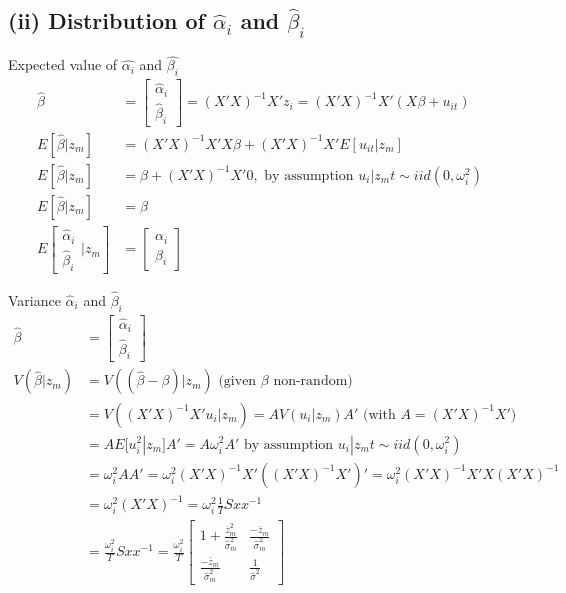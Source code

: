 \documentclass[]{article}
\begin{document}
\subsection{(ii) Distribution of  $\hat{\alpha}_i$ and $\hat{\beta}_i$}

Expected value of $\hat{\alpha_i}$ and $\hat{\beta_i}$
\begin{align*}
	\hat{\beta} &= \left[\begin{array}{c}
		\hat{\alpha}_i \\
		\hat{\beta}_i
	\end{array}\right] = (X'X)^{-1}X'z_i = (X'X)^{-1}X'(X \beta + u_{it})\\
	E[\hat{\beta}|z_m] &= (X'X)^{-1}X'X \beta + (X'X)^{-1}X'E[u_{it}|z_m]\\
	E[\hat{\beta}|z_m] &= \beta + (X'X)^{-1}X'0, \text{ by assumption } u_i|z_mt \sim iid(0, \omega_i^2)\\
	E[\hat{\beta}|z_m] &= \beta\\
	E\left[\begin{array}{c}
		\hat{\alpha}_i \\
		\hat{\beta}_i
	\end{array}|z_m\right] &= \left[\begin{array}{c}
		\alpha_i \\
		\beta_i
	\end{array}\right]
\end{align*}

Variance $\hat{\alpha}_i$ and $\hat{\beta}_i$
\begin{align*}
	\hat{\beta} &= \left[\begin{array}{c}
		\hat{\alpha}_i \\
		\hat{\beta}_i
	\end{array}\right]\\
	V(\hat{\beta}|z_m) &= V((\hat{\beta} - \beta)|z_m) \text{ (given $\beta$ non-random)}\\
	&= V((X'X)^{-1}X'u_{i}|z_m) = A V(u_{i}|z_m)A' \text{ (with $A=(X'X)^{-1}X'$)}\\
	&= A E[u_{i}^2|z_m] A' = A \omega_i^2A' \text{ by assumption } u_i|z_mt \sim iid(0, \omega_i^2)\\
	&= \omega_i^2AA' = \omega_i^2(X'X)^{-1}X'((X'X)^{-1}X')' = \omega_i^2(X'X)^{-1}X'X(X'X)^{-1}\\
	&= \omega_i^2 (X'X)^{-1} = \omega_i^2 \frac{1}{T}Sxx^{-1}\\
	&= \frac{\omega_i^2}{T}Sxx^{-1} = \frac{\omega_i^2}{T} \left[\begin{array}{cc}
		1 + \frac{\bar{z}_m^2}{\hat{\sigma}_m^2} & \frac{-\bar{z}_m}{\hat{\sigma}_m^2} \\
		\frac{-\bar{z}_m}{\hat{\sigma}_m^2} & \frac{1}{\hat{\sigma}^2}
	\end{array}\right]
\end{align*}
\end{document}

